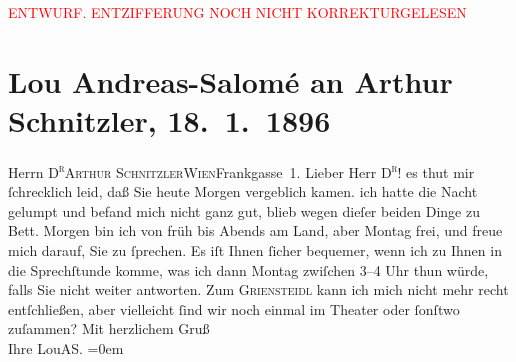 
\begin{center}
            \textcolor{red}{ENTWURF. ENTZIFFERUNG NOCH NICHT KORREKTURGELESEN}
                      \end{center}
            
               \section[Lou Andreas-Salomé an Arthur Schnitzler, 18. 1. 1896]{ Lou Andreas-Salomé an Arthur Schnitzler, 18. 1. 1896}\nopagebreak{}\rehead{ }\begin{ledgroupsized}[t]{13cm}\normalsize\beginnumbering{} \toendnotes[C]{\smallbreak\pagebreak[2]} 
\pstart{}{\pb}Herrn \textsc{D\textsuperscript{r}}\pend{}\pstart{}\textsc{Arthur Schnitzler}\pend{}\pstart{}\textsc{Wien}\pend{}\pstart{}Frankgasse 1.
                    \pend{}{\bigskip}\pstart
           \noindent{}{\pb}Lieber Herr \textsc{D\textsuperscript{r}}! es thut mir ſchrecklich leid, daß Sie heute Morgen
                    vergeblich kamen. ich hatte die Nacht gelumpt und befand mich nicht ganz gut,
                    blieb wegen dieſer beiden Dinge zu Bett. Morgen bin ich von früh bis Abends am
                    Land, aber Montag frei, und freue mich darauf, Sie zu ſprechen. Es iſt Ihnen
                    ſicher bequemer, wenn ich zu Ihnen in die Sprechſtunde komme, was ich dann
                    Montag zwiſchen 3–4 Uhr thun würde, falls Sie nicht weiter
                    antworten. Zum \textsc{Griensteidl} kann ich mich nicht mehr recht entſchließen, aber vielleicht ſind
                    wir noch einmal im Theater oder ſonſtwo zuſammen?\pend
           \pstart
           Mit herzlichem Gruß{\\[\baselineskip]}Ihre \spacefill\mbox{LouAS.}\pend
           \leftskip=0em{}\endnumbering{}\end{ledgroupsized}  \newcommand{\dateiname}{L00529}\newcommand{\titel}{Lou Andreas-Salomé an Arthur Schnitzler, 18. 1. 1896}\newcommand{\editorInnen}{Martin Anton Müller und Gerd-Hermann Susen}
      